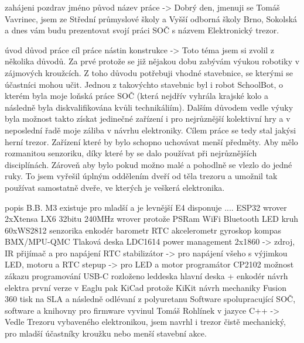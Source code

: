 zahájeni
{
    pozdrav
    jméno
    původ
    název práce
}-> Dobrý den, jmenuji se Tomáš Vavrinec, jsem ze Střední průmyslové školy a Vyšší odborná školy Brno, Sokolská
a dnes vám budu prezentovat 
    svojí práci SOČ s názvem Elektronický trezor.

úvod
{
    důvod práce
    cíl práce
    nástin konstrukce
}-> Toto téma jsem si zvolil z několika důvodů. Za prvé protože se již nějakou dobu zabývám 
    výukou robotiky v zájmových kroužcích. Z toho důvodu potřebuji vhodné stavebnice, se kterými 
    se účastníci mohou učit. Jednou z takovýchto stavebnic byl i robot SchoolBot, 
    o kterém byla moje loňská práce SOČ (která nejdřív vyhrála krajské kolo a následně 
    byla diskvalifikována kvůli technikáliím). %
    Dalším důvodem vedle výuky byla možnost 
    takto získat jedinečné zařízení i pro nejrůznější kolektivní hry a v neposlední řadě 
    moje záliba v návrhu elektroniky. 
    Cílem práce se tedy stal jakýsi herní trezor. Zařízení které by bylo schopno uchovávat 
    menší předměty. Aby mělo rozmanitou senzoriku, díky které by se dalo používat při 
    nejrůznějších disciplínách. Zároveň aby bylo pokud možno malé a pohodlně se vlezlo 
    do jedné ruky. To jsem vyřešil úplným oddělením dveří od těla trezoru a umožnil 
    tak používat samostatně dveře, ve kterých je veškerá elektronika.

popis B.B.
{
    M3
        existuje
        pro mladší a je levnější
    E4
        disponuje ....
            ESP32 wrover
                2xXtensa LX6
                    32bitu
                    240MHz
                wrover protože PSRam
                WiFi
                Bluetooth
            LED kruh
                60xWS2812
            senzorika
                enkodér  
                barometr
                RTC
                akcelerometr
                gyroskop
                kompas
                    BMX/MPU-QMC
                Tlaková deska
                    LDC1614                 %
            power management
                2x1860       -> zdroj, IR přijímač a pro napájení RTC
                stabilizátor -> pro napájení všeho s výjimkou LED, motoru a RTC
                stepup       -> pro LED a motor
            programátor
                CP2102 
                možnost zákazu programování
                USB-C
        rozloženo
            leddeska
            hlavní deska + enkodér
        návrh elektra
            první verze v Eaglu
            pak KiCad protože KiKit
        návrh mechaniky
            Fusion 360
            tisk na SLA a následně odlévaní z polyuretanu
        Software
            spolupracující SOČ, software a knihovny pro firmware vyvinul Tomáš Rohlínek 
                    v jazyce C++
}-> Vedle Trezoru vybaveného elektronikou, jsem navrhl i trezor čistě mechanický, 
    pro mladší účastníky kroužku nebo menší stavební akce.
    
